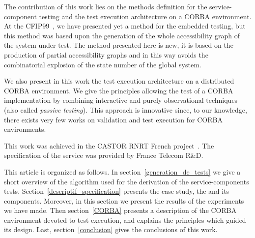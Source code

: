 The contribution of this work lies on the methods definition for the
service-component testing and the test execution architecture on a
CORBA environment. At the CFIP99~\cite{cfip99}, we have presented yet
a method for the embedded testing, but this method was based upon the
generation of the whole accessibility graph of the system under test.
The method presented here is new, it is based on the production of
partial accessibility graphs and in this way avoids the combinatorial
explosion of the state number of the global system.

We also present in this work the test execution architecture on a
distributed CORBA environment. We give the principles allowing the
test of a CORBA implementation by combining interactive and purely
observational techniques (also called \emph{passive testing}). This
approach is innovative since, to our knowledge, there exists very few
works on validation and test execution for CORBA environments.

This work was achieved in the CASTOR RNRT French
project~\cite{castor}. The specification of the \audio service was
provided by France Telecom R\&D.

This article is organized as follows. In
section~\ref{generation_de_tests} we give a short overview of the
algorithm used for the derivation of the service-components
tests. Section~\ref{descriptif_specification} presents the case study,
the \audio and its components. Moreover, in this section we 
present the results of the experiments we have made. Then
section~\ref{CORBA} presents a description of the CORBA environment
devoted to test execution, and explains the principles which guided
its design. Last, section~\ref{conclusion} gives the conclusions of
this work.




